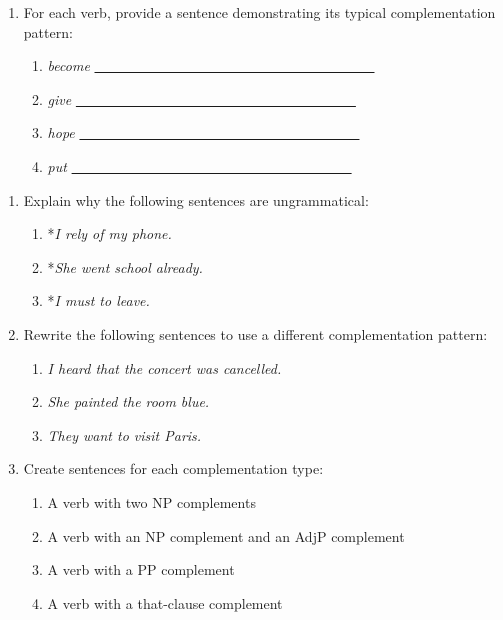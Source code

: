 \begin{tcolorbox}[title=Exercise: Verb Complementation Patterns, colback=white, colframe=red!75!black, fonttitle=\bfseries]
\begin{enumerate}[nosep]
\item For each verb, provide a sentence demonstrating its typical complementation pattern:

   \begin{enumerate}[nosep]
   \item \textit{become} \hfill\uline{~~~~~~~~~~~~~~~~~~~~~~~~~~~~~~~~~~~~~~~~}
   \item \textit{give} \hfill\uline{~~~~~~~~~~~~~~~~~~~~~~~~~~~~~~~~~~~~~~~~}
   \item \textit{hope} \hfill\uline{~~~~~~~~~~~~~~~~~~~~~~~~~~~~~~~~~~~~~~~~}
   \item \textit{put} \hfill\uline{~~~~~~~~~~~~~~~~~~~~~~~~~~~~~~~~~~~~~~~~}
   \end{enumerate}
\end{enumerate}
\end{tcolorbox}

\begin{tcolorbox}[title=Exercise: Verb Complementation Patterns (continued), colback=white, colframe=red!75!black, fonttitle=\bfseries]

\begin{enumerate}[nosep]
\item Explain why the following sentences are ungrammatical:

   \begin{enumerate}[nosep]
   \item *\textit{I rely of my phone.}
   \item *\textit{She went school already.}
   \item *\textit{I must to leave.}
   \end{enumerate}

\item Rewrite the following sentences to use a different complementation pattern:

   \begin{enumerate}[nosep]
   \item \textit{I heard that the concert was cancelled.}
   \item \textit{She painted the room blue.}
   \item \textit{They want to visit Paris.}
   \end{enumerate}

\item Create sentences for each complementation type:

   \begin{enumerate}[nosep]
   \item A verb with two NP complements
   \item A verb with an NP complement and an AdjP complement
   \item A verb with a PP complement
   \item A verb with a that-clause complement
   \end{enumerate}

\end{enumerate}
\end{tcolorbox}


